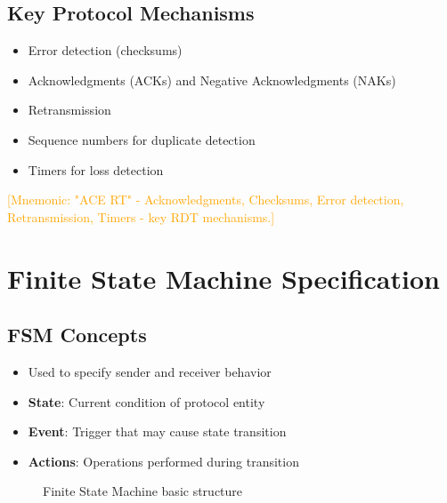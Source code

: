 \documentclass[12pt]{article}
\begin{document}
\subsection{Key Protocol Mechanisms}
\begin{itemize}
    \item Error detection (checksums)
    \item Acknowledgments (ACKs) and Negative Acknowledgments (NAKs)
    \item Retransmission
    \item Sequence numbers for duplicate detection
    \item Timers for loss detection
\end{itemize}

\textcolor{orange}{[Mnemonic: "ACE RT" - Acknowledgments, Checksums, Error detection, Retransmission, Timers - key RDT mechanisms.]}

\section{Finite State Machine Specification}

\subsection{FSM Concepts}
\begin{itemize}
    \item Used to specify sender and receiver behavior
    \item \textbf{State}: Current condition of protocol entity
    \item \textbf{Event}: Trigger that may cause state transition
    \item \textbf{Actions}: Operations performed during transition
\end{itemize}

\begin{figure}[h]
    \centering
    \caption{Finite State Machine basic structure}
    \label{fig:fsm_basic}
\end{figure}
\end{document}
